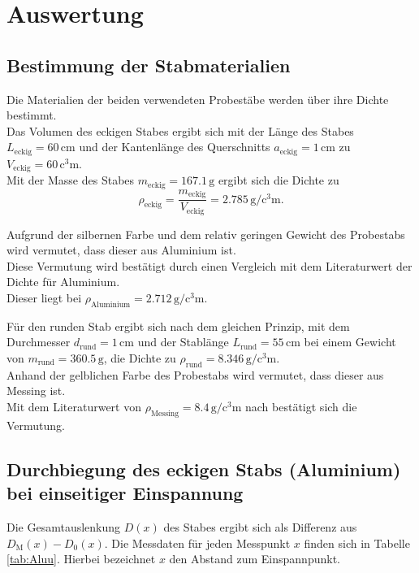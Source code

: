 \section{Auswertung}
\label{sec:Auswertung}
\subsection{Bestimmung der Stabmaterialien}
Die Materialien der beiden verwendeten Probestäbe werden über ihre Dichte bestimmt.\\
Das Volumen des eckigen Stabes ergibt sich mit der Länge des Stabes $L_{\mathrm{eckig}}=60\,\si{\centi\meter}$
und der Kantenlänge des Querschnitts $a_{\mathrm{eckig}}=1\,\si{\centi\meter}$ zu $V_{\mathrm{eckig}}=60\,\si{\cubic\centi\meter}$.\\
Mit der Masse des Stabes $m_{\mathrm{eckig}}=167.1\,\si{\gram}$ ergibt sich die Dichte zu
\begin{equation}
	\rho_{\mathrm{eckig}}=\frac{m_{\mathrm{eckig}}}{V_{\mathrm{eckig}}}=2.785 \,\si{\gram\per\cubic\centi\meter}\text{.}
\end{equation}

Aufgrund der silbernen Farbe und dem relativ geringen Gewicht des Probestabs wird vermutet, dass dieser aus Aluminium ist.\\
Diese Vermutung wird bestätigt durch einen Vergleich mit dem Literaturwert der Dichte für Aluminium.\\
Dieser liegt bei $\rho_{\mathrm{Aluminium}}=2.712\,\si{\gram\per\cubic\centi\meter}$. \cite{Werkzeugkiste}

Für den runden Stab ergibt sich nach dem gleichen Prinzip, mit dem Durchmesser $d_{\mathrm{rund}}=1\,\si{\centi\meter}$ und der Stablänge $L_{\mathrm{rund}}=55\,\si{\centi\meter}$ bei einem
Gewicht von $m_{\mathrm{rund}}=360.5\,\si{\gram}$, die Dichte zu $\rho_{\mathrm{rund}}=8.346 \,\si{\gram\per\cubic\centi\meter}$.\\
Anhand der gelblichen Farbe des Probestabs wird vermutet, dass dieser aus Messing ist.\\
Mit dem Literaturwert von $\rho_{\mathrm{Messing}}=8.4\,\si{\gram\per\cubic\centi\meter}$ nach \cite{Werkzeugkiste} %
bestätigt sich die Vermutung.

\FloatBarrier
\subsection{Durchbiegung des eckigen Stabs (Aluminium) bei einseitiger Einspannung}
Die Gesamtauslenkung $D(x)$ des Stabes ergibt sich als Differenz aus $D_{\mathrm{M}}(x)-D_{\mathrm{0}}(x)$.
Die Messdaten für jeden Messpunkt $x$ finden sich in Tabelle \ref{tab:Aluu}. Hierbei bezeichnet $x$ den Abstand zum Einspannpunkt.

